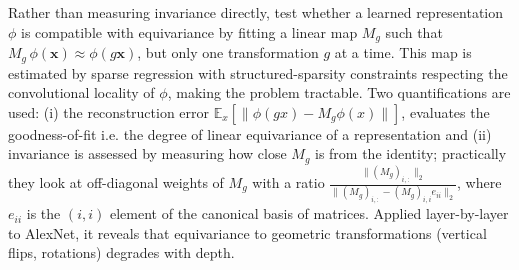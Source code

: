 \documentclass[mathematics,review,submit,moreauthors]{Definitions/mdpi}
\begin{document}
Rather than measuring invariance directly, \citet{lenc2014a} test whether a learned representation $\phi$ is compatible with equivariance by fitting a linear map $M_g$ such that $M_g\,\phi(\mathbf{x}) \approx \phi(g\mathbf{x})$, but only one transformation $g$ at a time.
This map is estimated by sparse regression with structured-sparsity constraints respecting the convolutional locality of $\phi$, making the problem tractable.
Two quantifications are used: (i) the reconstruction error $\mathbb{E}_x[\|\phi(gx)-M_g\phi(x)\|]$, evaluates the goodness-of-fit i.e. the degree of linear equivariance of a representation and (ii) invariance is assessed by measuring how close $M_g$ is from the identity; practically they look at off-diagonal weights of $M_g$ with a ratio $\frac{\|(M_g)_{i,:}\|_2}{\|(M_g)_{i,:}-(M_g)_{i,i}e_{ii}\|_2}$, where $e_{ii}$ is the $(i,i)$ element of the canonical basis of matrices.
Applied layer-by-layer to AlexNet, it reveals that equivariance to geometric transformations (vertical flips, rotations) degrades with depth.
\end{document}
